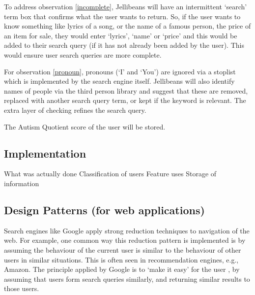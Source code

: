 \documentclass[a4paper, 11pt]{article}
\begin{document}
\vspace{5mm} %
To address observation \ref{incomplete}, Jellibeans will have an intermittent `search' term box that confirms what the user wants to return. So, if the user wants to know something like lyrics of a song, or the name of a famous person, the price of an item for sale, they would enter `lyrics', `name' or `price' and this would be added to their search query (if it has not already been added by the user). This would ensure user search queries are more complete.

\vspace{5mm} %
For observation \ref{pronoun}, pronouns (`I' and `You') are ignored via a stoplist which is implemented by the search engine itself. Jellibeans will also identify names of people via the third person library and suggest that these are removed, replaced with another search query term, or kept if the keyword is relevant. The extra layer of checking refines the search query.

\vspace{5mm} %

The Autism Quotient score of the user will be stored.

\subsection{Implementation}
What was actually done
Classification of users
Feature uses
Storage of information

\subsection{Design Patterns (for web applications)}

Search engines like Google apply strong reduction techniques to navigation of the web. For example, one common way this reduction pattern is implemented is by assuming the behaviour of the current user is similar to the behaviour of other users in similar situations. This is often seen in recommendation engines, e.g., Amazon. The principle applied by Google is to ‘make it easy’ for the user \cite{googleTerms}, by assuming that users form search queries similarly, and returning similar results to those users.
\end{document}
